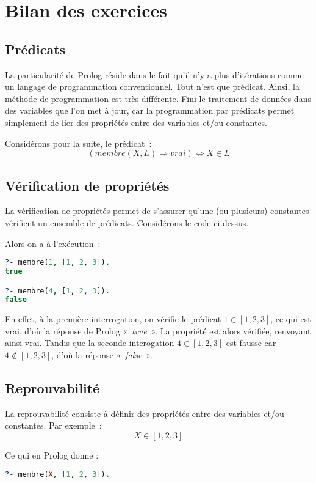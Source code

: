 \chapter{Bilan des exercices}

\section{Prédicats}

La particularité de Prolog réside dans le fait qu'il n'y a plus d'itérations comme
un langage de programmation conventionnel. Tout n'est que prédicat. Ainsi, la
méthode de programmation est très différente. Fini le traitement de données
dans des variables que l'on met à jour, car la programmation par prédicats permet
simplement de lier des propriétés entre des variables et/ou constantes.

Considérons pour la suite, le prédicat~:
\[
	(membre(X, L) \Rightarrow vrai) \Leftrightarrow X \in L
\]


\section{Vérification de propriétés}

La vérification de propriétés permet de s'assurer qu'une (ou plusieurs) constantes
vérifient un ensemble de prédicats. Considérons le code ci-dessus.

Alors on a à l'exécution~:

\begin{lstlisting}[language=Prolog,frame=single]
?- membre(1, [1, 2, 3]).
true

?- membre(4, [1, 2, 3]).
false
\end{lstlisting}

En effet, à la première interrogation, on vérifie le prédicat $1 \in [1, 2, 3]$,
ce qui est vrai, d'où la réponse de Prolog «~\textit{true}~». La propriété est alors vérifiée, 
renvoyant ainsi vrai. Tandis que la seconde interogation $4 \in [1, 2, 3]$ est fausse car 
$4 \notin [1, 2, 3]$, d'où la réponse «~\textit{false}~».


\section{Reprouvabilité}

La reprouvabilité consiste à définir des propriétés entre des
variables et/ou constantes. Par exemple~:
\[
	X \in [1, 2, 3]
\]

 Ce qui en Prolog donne :
\begin{lstlisting}[language=Prolog]
?- membre(X, [1, 2, 3]).
\end{lstlisting}


